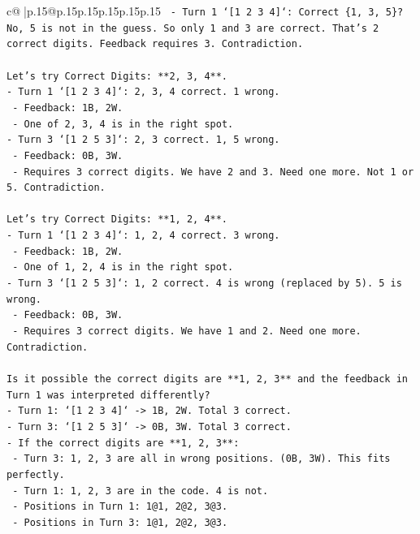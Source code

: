 \documentclass{article}
\begin{document}
{\begin{supertabular}{c@{$\;$}|p{.15\linewidth}@{}p{.15\linewidth}p{.15\linewidth}p{.15\linewidth}p{.15\linewidth}p{.15\linewidth}}
{{{\texttt{  {-} Turn 1 `{[}1 2 3 4{]}`: Correct \{1, 3, 5\}? No, 5 is not in the guess. So only 1 and 3 are correct. That's 2 correct digits. Feedback requires 3. Contradiction.} \\
\\ 
\texttt{Let's try Correct Digits: **2, 3, 4**.} \\
\texttt{{-} Turn 1 `{[}1 2 3 4{]}`: 2, 3, 4 correct. 1 wrong.} \\
\texttt{  {-} Feedback: 1B, 2W.} \\
\texttt{  {-} One of 2, 3, 4 is in the right spot.} \\
\texttt{{-} Turn 3 `{[}1 2 5 3{]}`: 2, 3 correct. 1, 5 wrong.} \\
\texttt{  {-} Feedback: 0B, 3W.} \\
\texttt{  {-} Requires 3 correct digits. We have 2 and 3. Need one more. Not 1 or 5. Contradiction.} \\
\\ 
\texttt{Let's try Correct Digits: **1, 2, 4**.} \\
\texttt{{-} Turn 1 `{[}1 2 3 4{]}`: 1, 2, 4 correct. 3 wrong.} \\
\texttt{  {-} Feedback: 1B, 2W.} \\
\texttt{  {-} One of 1, 2, 4 is in the right spot.} \\
\texttt{{-} Turn 3 `{[}1 2 5 3{]}`: 1, 2 correct. 4 is wrong (replaced by 5). 5 is wrong.} \\
\texttt{  {-} Feedback: 0B, 3W.} \\
\texttt{  {-} Requires 3 correct digits. We have 1 and 2. Need one more. Contradiction.} \\
\\ 
\texttt{Is it possible the correct digits are **1, 2, 3** and the feedback in Turn 1 was interpreted differently?} \\
\texttt{{-} Turn 1: `{[}1 2 3 4{]}` {-}> 1B, 2W. Total 3 correct.} \\
\texttt{{-} Turn 3: `{[}1 2 5 3{]}` {-}> 0B, 3W. Total 3 correct.} \\
\texttt{{-} If the correct digits are **1, 2, 3**:} \\
\texttt{  {-} Turn 3: 1, 2, 3 are all in wrong positions. (0B, 3W). This fits perfectly.} \\
\texttt{  {-} Turn 1: 1, 2, 3 are in the code. 4 is not.} \\
\texttt{    {-} Positions in Turn 1: 1@1, 2@2, 3@3.} \\
\texttt{    {-} Positions in Turn 3: 1@1, 2@2, 3@3.} \\
}}}
\end{supertabular}}
\end{document}
